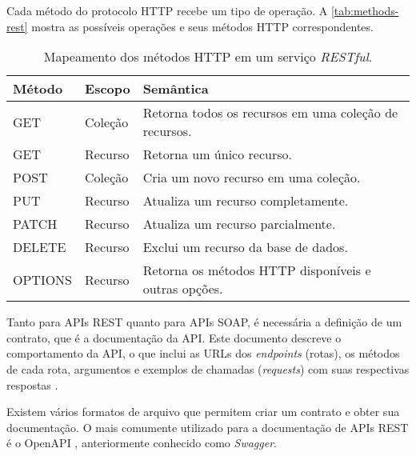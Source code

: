 Cada método do protocolo HTTP recebe um tipo de operação. A \autoref{tab:methods-rest} mostra as possíveis operações e seus métodos HTTP correspondentes.

\begin{table}[t]
	\centering
	\caption{Mapeamento dos métodos HTTP em um serviço \textit{RESTful}.}
	\label{tab:methods-rest}
	\begin{tabular}{p{2cm}p{2cm}p{9cm}}
		\hline
		\textbf{Método} &
		\textbf{Escopo} &
		\textbf{Semântica}                                    \\[5mm]

		\hline
		GET             &
		Coleção         &
		Retorna todos os recursos em uma coleção de recursos. \\[5mm]

		\hline
		GET             &
		Recurso         &
		Retorna um único recurso.                             \\[5mm]

		\hline
		POST            &
		Coleção         &
		Cria um novo recurso em uma coleção.                  \\[5mm]

		\hline
		PUT             &
		Recurso         &
		Atualiza um recurso completamente.                    \\[5mm]

		\hline
		PATCH           &
		Recurso         &
		Atualiza um recurso parcialmente.                     \\[5mm]

		\hline
		DELETE          &
		Recurso         &
		Exclui um recurso da base de dados.                   \\[5mm]

		\hline
		OPTIONS         &
		Recurso         &
		Retorna os métodos HTTP disponíveis e outras opções.  \\[5mm]

		\hline
	\end{tabular}
\end{table}

Tanto para APIs REST quanto para APIs SOAP, é necessária a definição de um contrato, que é a documentação da API. Este documento descreve o comportamento da API, o que inclui as URLs dos \textit{endpoints} (rotas), os métodos de cada rota, argumentos e exemplos de chamadas (\textit{requests}) com suas respectivas respostas \cite{santos2020apicontract}.

Existem vários formatos de arquivo que permitem criar um contrato e obter sua documentação. O mais comumente utilizado para a documentação de APIs REST é o OpenAPI \cite{santos2020openapi}, anteriormente conhecido como \textit{Swagger}.

